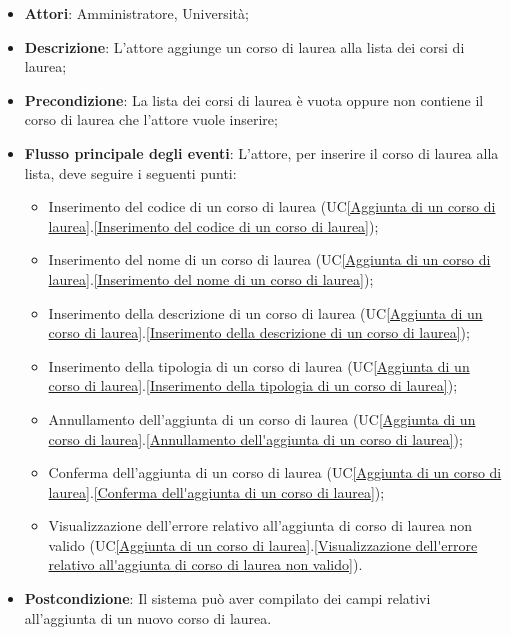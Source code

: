 \begin{itemize}
	\item \textbf{Attori}: Amministratore, Università;
	\item \textbf{Descrizione}: L'attore aggiunge un corso di laurea alla lista dei corsi di laurea;
	\item \textbf{Precondizione}: La lista dei corsi di laurea è vuota oppure non contiene il corso di laurea che l'attore vuole inserire;
	\item \textbf{Flusso principale degli eventi}: L'attore, per inserire il corso di laurea alla lista, deve seguire i seguenti punti:
	\begin{itemize}
		\item Inserimento del codice di un corso di laurea (UC\ref{Aggiunta di un corso di laurea}.\ref{Inserimento del codice di un corso di laurea});
		\item Inserimento del nome di un corso di laurea (UC\ref{Aggiunta di un corso di laurea}.\ref{Inserimento del nome di un corso di laurea});
		\item Inserimento della descrizione di un corso di laurea (UC\ref{Aggiunta di un corso di laurea}.\ref{Inserimento della descrizione di un corso di laurea});
		\item Inserimento della tipologia di un corso di laurea (UC\ref{Aggiunta di un corso di laurea}.\ref{Inserimento della tipologia di un corso di laurea});
		\item Annullamento dell'aggiunta di un corso di laurea (UC\ref{Aggiunta di un corso di laurea}.\ref{Annullamento dell'aggiunta di un corso di laurea});
		\item Conferma dell'aggiunta di un corso di laurea (UC\ref{Aggiunta di un corso di laurea}.\ref{Conferma dell'aggiunta di un corso di laurea});
		\item Visualizzazione dell'errore relativo all'aggiunta di corso di laurea non valido (UC\ref{Aggiunta di un corso di laurea}.\ref{Visualizzazione dell'errore relativo all'aggiunta di corso di laurea non valido}).
	\end{itemize}
	\item \textbf{Postcondizione}: Il sistema può aver compilato dei campi relativi all'aggiunta di un nuovo corso di laurea.
\end{itemize}





